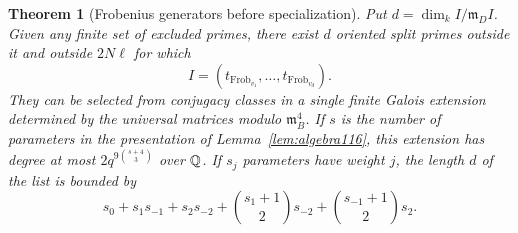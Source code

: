 \documentclass[a4paper,11pt]{article}
\newtheorem{theorem}[proposition]{Theorem}
\theoremstyle{definition}
\theoremstyle{remark}
\newcommand{\Frob}{\operatorname{Frob}}\newcommand{\Gal}{\operatorname{Gal}}
\numberwithin{equation}{section}
\begin{document}
\begin{theorem}[Frobenius generators before specialization]
\label{thm:ideal124}
Put \(d=\dim_k I/\mathfrak m_D I\). Given any finite set of
excluded primes, there exist \(d\) oriented split primes
outside it and outside \(2N\ell\) for which
\begin{equation}
                 I=(t_{\Frob_{v_1}},\ldots,t_{\Frob_{v_d}}).
                                                        \label{eq:ideal124}
\end{equation}
They can be selected from conjugacy classes in a single finite
Galois extension determined by the universal matrices modulo
\(\mathfrak m_B^4\). If \(s\) is the number of parameters in
the presentation of Lemma~\ref{lem:algebra116}, this extension
has degree at most \(2q^{9\binom{s+4}{3}}\) over \(\mathbb Q\).
If \(s_j\) parameters have weight \(j\), the length \(d\) of
the list is bounded by
\[
 s_0+s_1s_{-1}+s_2s_{-2}
       +\binom{s_1+1}{2}s_{-2}+\binom{s_{-1}+1}{2}s_2 .
\]
\end{theorem}
\end{document}

